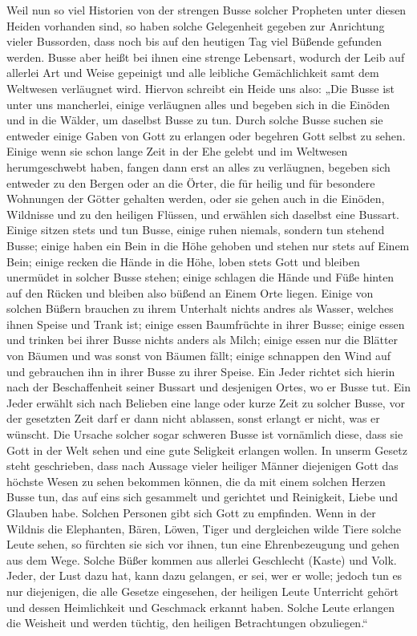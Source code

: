 \documentclass{article}
\begin{document}
Weil nun so viel Historien von der strengen Busse solcher Propheten unter diesen Heiden vorhanden sind, so haben solche Gelegenheit gegeben zur Anrichtung vieler Bussorden, dass noch bis auf den heutigen Tag viel Büßende gefunden werden. Busse aber heißt bei ihnen eine strenge Lebensart, wodurch der Leib auf allerlei Art und Weise gepeinigt und alle leibliche Gemächlichkeit samt dem Weltwesen verläugnet wird. Hiervon schreibt ein Heide uns also: „Die Busse ist unter uns mancherlei, einige verläugnen alles und begeben sich in die Einöden und in die Wälder, um daselbst Busse zu tun. Durch solche Busse suchen sie entweder einige Gaben von Gott zu erlangen oder begehren Gott selbst zu sehen. Einige wenn sie schon lange Zeit in der Ehe gelebt und im Weltwesen herumgeschwebt haben, fangen dann erst an alles zu verläugnen, begeben sich entweder zu den Bergen oder an die Örter, die für heilig und für besondere Wohnungen der Götter gehalten werden, oder sie gehen auch in die Einöden, Wildnisse und zu den heiligen Flüssen, und erwählen sich daselbst eine Bussart. Einige sitzen stets und tun Busse, einige ruhen niemals, sondern tun stehend Busse; einige haben ein Bein in die Höhe gehoben und stehen nur stets auf Einem Bein; einige recken die Hände in die Höhe, loben stets Gott und bleiben unermüdet in solcher Busse stehen; einige schlagen die Hände und Füße hinten auf den Rücken und bleiben also büßend an Einem Orte liegen. Einige von solchen Büßern brauchen zu ihrem Unterhalt nichts andres als Wasser, welches ihnen Speise und Trank ist; einige essen Baumfrüchte in ihrer Busse; einige essen und trinken bei ihrer Busse nichts anders als Milch; einige essen nur die Blätter von Bäumen und was sonst von Bäumen fällt; einige schnappen den Wind auf und gebrauchen ihn in ihrer Busse zu ihrer Speise. Ein Jeder richtet sich hierin nach der Beschaffenheit seiner Bussart und desjenigen Ortes, wo er Busse tut. Ein Jeder erwählt sich nach Belieben eine lange oder kurze Zeit zu solcher Busse, vor der gesetzten Zeit darf er dann nicht ablassen, sonst erlangt er nicht, was er wünscht. Die Ursache solcher sogar schweren Busse ist vornämlich diese, dass sie Gott in der Welt sehen und eine gute Seligkeit erlangen wollen. In unserm Gesetz steht geschrieben, dass nach Aussage vieler heiliger Männer diejenigen Gott das höchste Wesen zu sehen bekommen können, die da mit einem solchen Herzen Busse tun, das auf eins sich gesammelt und gerichtet und Reinigkeit, Liebe und Glauben habe. Solchen Personen gibt sich Gott zu empfinden. Wenn in der Wildnis die Elephanten, Bären, Löwen, Tiger und dergleichen wilde Tiere solche Leute sehen, so fürchten sie sich vor ihnen, tun eine Ehrenbezeugung und gehen aus dem Wege. Solche Büßer kommen aus allerlei Geschlecht (Kaste) und Volk. Jeder, der Lust dazu hat, kann dazu gelangen, er sei, wer er wolle; jedoch tun es nur diejenigen, die alle Gesetze eingesehen, der heiligen Leute Unterricht gehört und dessen Heimlichkeit und Geschmack erkannt haben. Solche Leute erlangen die Weisheit und werden tüchtig, den heiligen Betrachtungen obzuliegen.“
\end{document}
